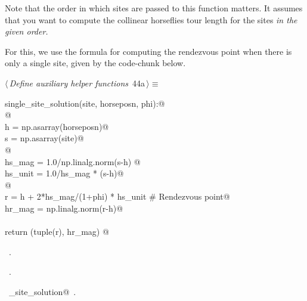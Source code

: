 \documentclass[11.5pt]{report}
\begin{document}
Note that the order in which sites are passed to this function matters. It 
assumes that you want to compute the collinear horseflies tour length for the 
sites \textit{in the given order.} 

For this, we use the formula for computing the rendezvous point when there is 
only a single site, given by the code-chunk below. 


\begin{flushleft} \small\label{scrap64}\raggedright\small
{} $\langle\,${\itshape Define auxiliary helper functions}\nobreak\ {\footnotesize {44a}}$\,\rangle\equiv$
\vspace{-1ex}
\begin{list}{}{} \item
\mbox{}\verb@def single_site_solution(site, horseposn, phi):@\\
\mbox{}\verb@     @\\
\mbox{}\verb@     h = np.asarray(horseposn)@\\
\mbox{}\verb@     s = np.asarray(site)@\\
\mbox{}\verb@     @\\
\mbox{}\verb@     hs_mag  = 1.0/np.linalg.norm(s-h) @\\
\mbox{}\verb@     hs_unit = 1.0/hs_mag * (s-h)@\\
\mbox{}\verb@     @\\
\mbox{}\verb@     r      = h +  2*hs_mag/(1+phi) * hs_unit # Rendezvous point@\\
\mbox{}\verb@     hr_mag = np.linalg.norm(r-h)@\\
\mbox{}\verb@@\\
\mbox{}\verb@     return (tuple(r), hr_mag) @\\
\mbox{}\verb@@{\NWsep}
\end{list}
\vspace{-1.5ex}
\footnotesize
\begin{list}{}{\setlength{\itemsep}{-\parsep}\setlength{\itemindent}{-\leftmargin}}
\item \NWtxtMacroDefBy\ .
\item \NWtxtMacroRefIn\ .
\item \NWtxtIdentsDefed\nobreak\  \verb@single_site_solution@\nobreak\ .
\item{}
\end{list}
\vspace{4ex}
\end{flushleft}
\end{document}
